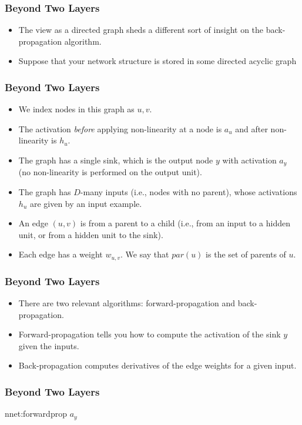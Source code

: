 \documentclass[trans]{beamer}
\begin{document}
\begin{frame}
  \frametitle{Beyond Two Layers}
\begin{itemize}
\item
The view as a directed graph sheds a different sort of
insight on the back-propagation algorithm.
\item Suppose that your network structure is stored in some directed acyclic
graph
\end{itemize}
\end{frame}

\begin{frame}
  \frametitle{Beyond Two Layers}
\begin{itemize}
\item
 We index nodes in this
graph as $u,v$.  
\item The activation \emph{before} applying non-linearity
at a node is $a_u$ and after non-linearity is $h_u$.  
\item The graph has a
single sink, which is the output node $y$ with activation $a_y$ (no
non-linearity is performed on the output unit). 
\item  The graph has
$D$-many inputs (i.e., nodes with no parent), whose activations $h_u$
are given by an input example.  
\item An edge $(u,v)$ is from a parent to a
child (i.e., from an input to a hidden unit, or from a hidden unit to
the sink). 
\item Each edge has a weight $w_{u,v}$.  We say that
$\textit{par}(u)$ is the set of parents of $u$.
\end{itemize}
\end{frame}

\begin{frame}
  \frametitle{Beyond Two Layers}
\begin{itemize}
\item
There are two relevant algorithms: forward-propagation and
back-propagation.
\item  Forward-propagation tells you how to compute the
activation of the sink $y$ given the inputs.  
\item Back-propagation
computes derivatives of the edge weights for a given input.
\end{itemize}
\end{frame}

\begin{frame}
  \frametitle{Beyond Two Layers}
\newalgorithm%
  {nnet:forwardprop}%
  {}
  {
\ENDFOR
{}
\ENDFOR
\RETURN $a_y$
}
\end{frame}
\end{document}
